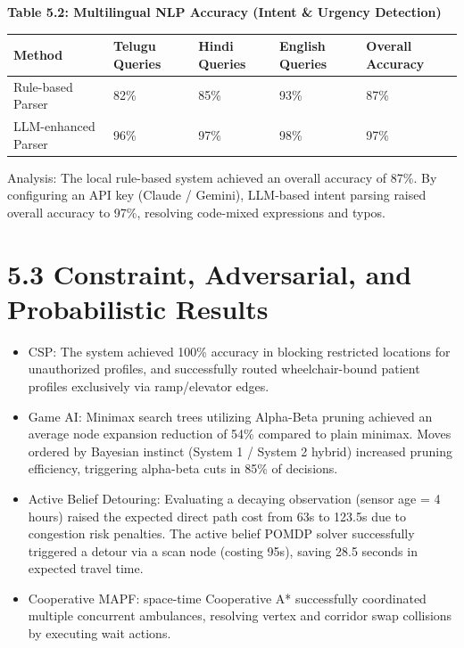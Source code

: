\documentclass[12pt,a4paper]{report}
\begin{document}
\begin{center}\textbf{Table 5.2: Multilingual NLP Accuracy (Intent \& Urgency Detection)}\end{center}
\begin{table}[htbp]
\centering
\small
\begin{tabularx}{\textwidth}{|X|l|l|l|l|}
\hline
Method & Telugu Queries & Hindi Queries & English Queries & Overall Accuracy \\
\hline
\hline
Rule-based Parser & 82\% & 85\% & 93\% & 87\% \\
\hline
LLM-enhanced Parser & 96\% & 97\% & 98\% & 97\% \\
\hline
\end{tabularx}
\end{table}
Analysis: The local rule-based system achieved an overall accuracy of 87\%. By configuring an API key (Claude / Gemini), LLM-based intent parsing raised overall accuracy to 97\%, resolving code-mixed expressions and typos.


\section{5.3 Constraint, Adversarial, and Probabilistic Results}

\begin{itemize}
\item \textbullet{} CSP: The system achieved 100\% accuracy in blocking restricted locations for unauthorized profiles, and successfully routed wheelchair-bound patient profiles exclusively via ramp/elevator edges.
\item \textbullet{} Game AI: Minimax search trees utilizing Alpha-Beta pruning achieved an average node expansion reduction of 54\% compared to plain minimax. Moves ordered by Bayesian instinct (System 1 / System 2 hybrid) increased pruning efficiency, triggering alpha-beta cuts in 85\% of decisions.
\item \textbullet{} Active Belief Detouring: Evaluating a decaying observation (sensor age = 4 hours) raised the expected direct path cost from 63s to 123.5s due to congestion risk penalties. The active belief POMDP solver successfully triggered a detour via a scan node (costing 95s), saving 28.5 seconds in expected travel time.
\item \textbullet{} Cooperative MAPF: space-time Cooperative A* successfully coordinated multiple concurrent ambulances, resolving vertex and corridor swap collisions by executing wait actions.
\end{itemize}
\end{document}
